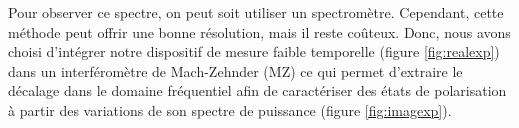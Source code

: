 \label{sec:imaginary_propose}
\begin{onehalfspace}


    \noindent Pour observer ce spectre, on peut soit utiliser un 
    spectromètre. Cependant, cette méthode peut offrir une 
    bonne résolution, mais il reste coûteux. 
    Donc, nous avons choisi d’intégrer notre dispositif de mesure faible 
    temporelle (figure \ref{fig:realexp}) 
    dans un interféromètre de 
    Mach-Zehnder (MZ) ce qui permet d’extraire le décalage 
    dans le domaine fréquentiel afin de caractériser 
    des états de polarisation à partir des variations de son 
    spectre de puissance (figure \ref{fig:imagexp}).


\end{onehalfspace}
